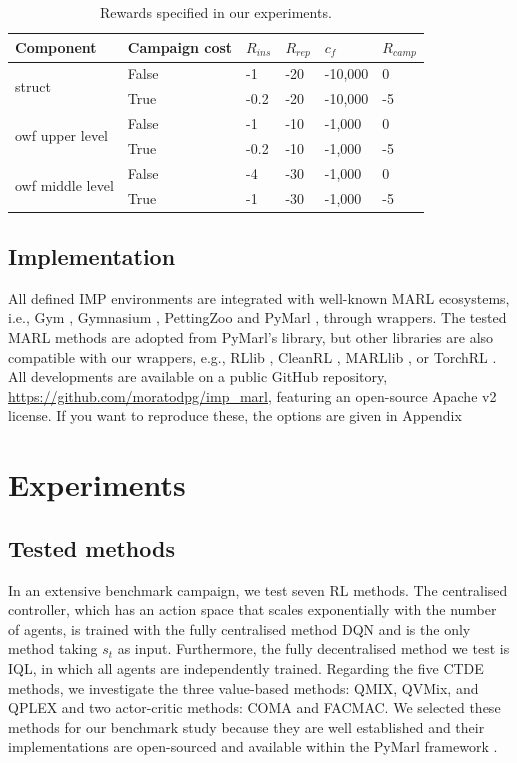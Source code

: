 \begin{table}
\centering
\caption{Rewards specified in our experiments.}
\label{tab:rewards_det}
\begin{tabular}{llllll}
\toprule
Component & Campaign cost & $R_{ins}$ & $R_{rep}$ &  $c_f$ & $R_{camp}$ \\
\bottomrule
\multirow{2}{*}{struct} &  False & -1 & -20 & -10,000 & 0  \\ 
& True & -0.2 & -20 & -10,000 & -5   \\
\bottomrule
\multirow{2}{*}{owf upper level} & False & -1 & -10 & -1,000 & 0     \\
& True  & -0.2 & -10 & -1,000 & -5     \\
\multirow{2}{*}{owf middle level} & False & -4 & -30 & -1,000 & 0    \\
& True & -1 & -30 & -1,000 & -5    \\
\bottomrule
\end{tabular}
\end{table}

\subsection{Implementation}

All defined IMP environments are integrated with well-known MARL ecosystems, i.e., Gym \citep{openaigym}, Gymnasium \citep{towers_gymnasium_2023}, PettingZoo \citep{terry2021pettingzoo} and PyMarl \citep{samvelyan2019starcraft}, through wrappers.
The tested MARL methods are adopted from PyMarl's library, but other libraries are also compatible with our wrappers, e.g., RLlib \citep{liang2018rllib}, CleanRL \citep{huang2022cleanrl}, MARLlib \citep{hu2022marllib}, or TorchRL \citep{bou2023torchrl}.
All developments are available on a public GitHub repository, \url{https://github.com/moratodpg/imp\_marl}, featuring an open-source Apache v2 license.
If you want to reproduce these, the options are given in Appendix 
\section{Experiments}\label{sec:ch5_appendix_imp_public_repo}

\subsection{Tested methods}
\label{sec:tested_method}
In an extensive benchmark campaign, we test seven RL methods.
The centralised controller, which has an action space that scales exponentially with the number of agents, is trained with the fully centralised method DQN and is the only method taking $s_t$ as input.
Furthermore, the fully decentralised method we test is IQL, in which all agents are independently trained.
Regarding the five CTDE methods, we investigate the three value-based methods: QMIX, QVMix, and QPLEX and two actor-critic methods: COMA and FACMAC.
We selected these methods for our benchmark study because they are well established and their implementations are open-sourced and available within the PyMarl framework \citep{samvelyan2019starcraft}.

